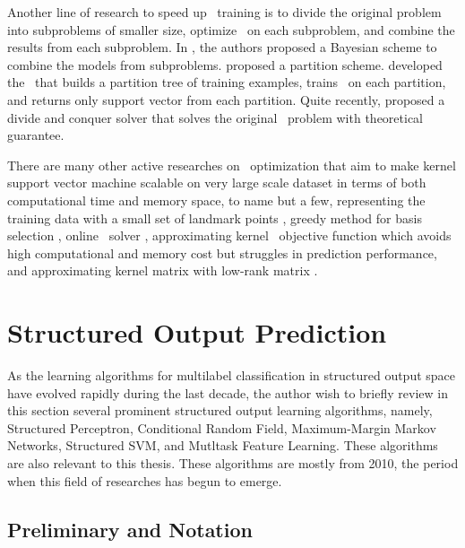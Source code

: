 {Another line of research to speed up \svm\ training is to divide the original problem into subproblems of smaller size, optimize \svm\ on each subproblem, and combine the results from each subproblem.
In \citep{Tresp00a,Schwaighofer01the}, the authors proposed a Bayesian scheme to combine the models from subproblems.
\citet{Collobert02a} proposed a partition scheme.
\citet{Graf05parallel} developed the \svmcascade\ that builds a partition tree of training examples, trains \svm\ on each partition, and returns only support vector from each partition.
Quite recently, \citet{Hsieh14a} proposed a divide and conquer solver that solves the original \svm\ problem with theoretical guarantee.

There are many other active researches on \svm\ optimization that aim to make kernel support vector machine scalable on very large scale dataset in terms of both computational time and memory space, to name but a few, representing the training data with a small set of landmark points \citep{Pavlov00towards,Boley04training,Yu05making,Zhang08improved}, greedy method for basis selection \citep{Keerthi06building}, online \svm\ solver \citep{Bordes05fast}, approximating kernel \svm\ objective function \citep{Zhang12scaling, Le13fast} which avoids high computational and memory cost but struggles in prediction performance, and approximating kernel matrix with low-rank matrix \citep{Smola00sparse,Fine02efficient,Drineas05on,Si14memory}.




%
%
\section{Structured Output Prediction}

As the learning algorithms for multilabel classification in structured output space have evolved rapidly during the last decade, the author wish to briefly review in this section several prominent structured output learning algorithms, namely,  Structured Perceptron, Conditional Random Field, Maximum-Margin Markov Networks, Structured SVM, and Mutltask Feature Learning.
These algorithms are also relevant to this thesis.
These algorithms are mostly from 2010, the period when this field of researches has begun to emerge.


%
\subsection{Preliminary and Notation}\label{multilabel_preliminary}

}
